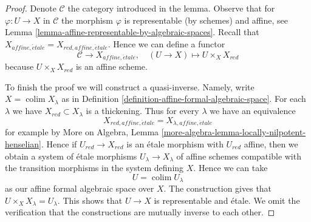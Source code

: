 \documentclass{stacks-project}
\theoremstyle{plain}
\theoremstyle{definition}
\theoremstyle{remark}
\numberwithin{equation}{subsection}
\def\colim{\mathop{\mathrm{colim}}\nolimits}
\def\etale{{\acute{e}tale}}
\begin{document}
\begin{proof}
Denote $\mathcal{C}$ the category introduced in the lemma.
Observe that for $\varphi : U \to X$ in $\mathcal{C}$ the
morphism $\varphi$ is representable (by schemes) and affine, see
Lemma \ref{lemma-affine-representable-by-algebraic-spaces}.
Recall that $X_{affine, \etale} = X_{red, affine, \etale}$.
Hence we can define a functor
$$
\mathcal{C} \longrightarrow X_{affine, \etale},\quad
(U \to X) \longmapsto U \times_X X_{red}
$$
because $U \times_X X_{red}$ is an affine scheme.

\medskip\noindent
To finish the proof we will construct a quasi-inverse.
Namely, write $X = \colim X_\lambda$ as in
Definition \ref{definition-affine-formal-algebraic-space}.
For each $\lambda$ we have $X_{red} \subset X_\lambda$
is a thickening. Thus for every $\lambda$ we have an
equivalence
$$
X_{red, affine, \etale} = X_{\lambda, affine, \etale}
$$
for example by
More on Algebra, Lemma \ref{more-algebra-lemma-locally-nilpotent-henselian}.
Hence if $U_{red} \to X_{red}$ is an \'etale morphism with
$U_{red}$ affine, then we obtain a system of \'etale morphisms
$U_\lambda \to X_\lambda$ of affine schemes compatible with the
transition morphisms in the system defining $X$. Hence we can take
$$
U = \colim U_\lambda
$$
as our affine formal algebraic space over $X$. The construction gives that
$U \times_X X_\lambda = U_\lambda$. This shows that $U \to X$ is
representable and \'etale. We omit the verification that the constructions
are mutually inverse to each other.
\end{proof}
\end{document}
